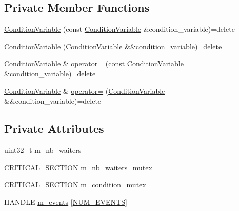 \subsection*{Private Member Functions}
\begin{DoxyCompactItemize}
\item 
\hyperlink{classmage_1_1_condition_variable_add5ccf5807a94588c28621141df334d3}{Condition\+Variable} (const \hyperlink{classmage_1_1_condition_variable}{Condition\+Variable} \&condition\+\_\+variable)=delete
\item 
\hyperlink{classmage_1_1_condition_variable_a225e5144abef5b2ba1d8393777f1c4f1}{Condition\+Variable} (\hyperlink{classmage_1_1_condition_variable}{Condition\+Variable} \&\&condition\+\_\+variable)=delete
\item 
\hyperlink{classmage_1_1_condition_variable}{Condition\+Variable} \& \hyperlink{classmage_1_1_condition_variable_ac83eae5353cd004ee06fe2376e5bdbf4}{operator=} (const \hyperlink{classmage_1_1_condition_variable}{Condition\+Variable} \&condition\+\_\+variable)=delete
\item 
\hyperlink{classmage_1_1_condition_variable}{Condition\+Variable} \& \hyperlink{classmage_1_1_condition_variable_a3f05c5b53b2530e9fdd1bb890aa375c4}{operator=} (\hyperlink{classmage_1_1_condition_variable}{Condition\+Variable} \&\&condition\+\_\+variable)=delete
\end{DoxyCompactItemize}
\subsection*{Private Attributes}
\begin{DoxyCompactItemize}
\item 
uint32\+\_\+t \hyperlink{classmage_1_1_condition_variable_ac02cb14000a597ec91b8546bdcbb9dd1}{m\+\_\+nb\+\_\+waiters}
\item 
C\+R\+I\+T\+I\+C\+A\+L\+\_\+\+S\+E\+C\+T\+I\+ON \hyperlink{classmage_1_1_condition_variable_a0686e682d62d44ff1eb9ac45acbb0eab}{m\+\_\+nb\+\_\+waiters\+\_\+mutex}
\item 
C\+R\+I\+T\+I\+C\+A\+L\+\_\+\+S\+E\+C\+T\+I\+ON \hyperlink{classmage_1_1_condition_variable_ab5ff870b2881a1979ccaec986d762441}{m\+\_\+condition\+\_\+mutex}
\item 
H\+A\+N\+D\+LE \hyperlink{classmage_1_1_condition_variable_aa3eeb3cf7cdcc70e651ee67800b713f5}{m\+\_\+events} \mbox{[}\hyperlink{classmage_1_1_condition_variable_a600fb5094237230f6b260b31d6fb0945a2c43161b9ddfb393865606bfb3a51fac}{N\+U\+M\+\_\+\+E\+V\+E\+N\+TS}\mbox{]}
\end{DoxyCompactItemize}



